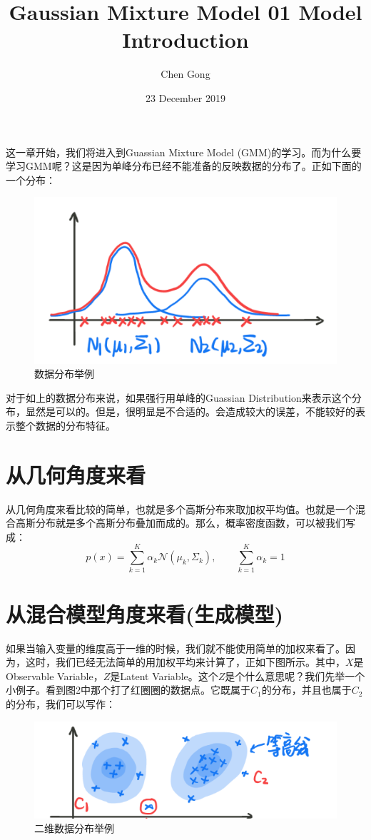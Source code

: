 \documentclass[a4paper]{article}
\title{Gaussian Mixture Model 01 Model Introduction}
\author{Chen Gong}
\date{23 December 2019}
\begin{document}
\maketitle
这一章开始，我们将进入到Guassian Mixture Model (GMM)的学习。而为什么要学习GMM呢？这是因为单峰分布已经不能准备的反映数据的分布了。正如下面的一个分布：
\begin{figure}[H]
    \centering
    \includegraphics[width=.55\textwidth]{微信图片_20191223221952.png}
    \caption{数据分布举例}
    
\end{figure}

对于如上的数据分布来说，如果强行用单峰的Guassian Distribution来表示这个分布，显然是可以的。但是，很明显是不合适的。会造成较大的误差，不能较好的表示整个数据的分布特征。

\section{从几何角度来看}
从几何角度来看比较的简单，也就是多个高斯分布来取加权平均值。也就是一个混合高斯分布就是多个高斯分布叠加而成的。那么，概率密度函数，可以被我们写成：
\begin{equation}
    p(x) = \sum_{k=1}^K \alpha_k \mathcal{N}(\mu_k, \Sigma_k), \qquad \sum_{k=1}^K \alpha_k = 1
\end{equation}

\section{从混合模型角度来看(生成模型)}
如果当输入变量的维度高于一维的时候，我们就不能使用简单的加权来看了。因为，这时，我们已经无法简单的用加权平均来计算了，正如下图所示。其中，$X$是Observable Variable，$Z$是Latent Variable。这个$Z$是个什么意思呢？我们先举一个小例子。看到图2中那个打了红圈圈的数据点。它既属于$C_1$的分布，并且也属于$C_2$的分布，我们可以写作：
\begin{figure}[H]
    \centering
    \includegraphics[width=.65\textwidth]{微信图片_20191223223203.png}
    \caption{二维数据分布举例}
    
\end{figure}
\end{document}
